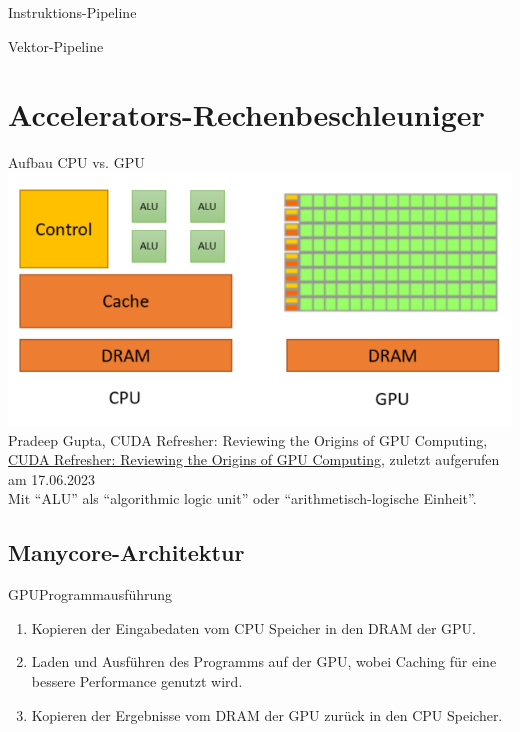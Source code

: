 \begin{defi}{Instruktions-Pipeline}

\end{defi}

\begin{defi}{Vektor-Pipeline}

\end{defi}

\section{Accelerators-Rechenbeschleuniger}

\begin{defi}{Aufbau CPU vs. GPU}
    \includegraphics[width=\textwidth]{images/CPUvsGPU.png}
    Pradeep Gupta, CUDA Refresher: Reviewing the Origins of GPU Computing,
    \url{CUDA Refresher: Reviewing the Origins of GPU Computing},
    zuletzt aufgerufen am 17.06.2023 \\
    Mit \enquote{ALU} als \enquote{algorithmic logic unit} oder \enquote{arithmetisch-logische Einheit}.
\end{defi}

\subsection{Manycore-Architektur}

\begin{defi}{GPU}{Programmausführung}
    \begin{enumerate}
        \item Kopieren der Eingabedaten vom CPU Speicher in den DRAM der GPU.
        \item Laden und Ausführen des Programms auf der GPU, wobei Caching für eine bessere Performance genutzt wird.
        \item Kopieren der Ergebnisse vom DRAM der GPU zurück in den CPU Speicher.
    \end{enumerate}
\end{defi}

